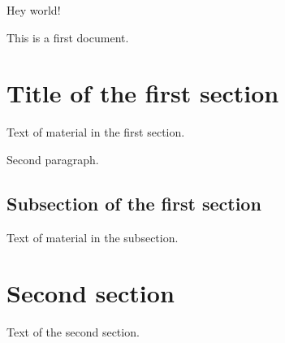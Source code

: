 \documentclass{article}
\begin{document}
	Hey world!
	
	This is a first document.
	
	\section{Title of the first section}
	
	Text of material in the first section.
	
	Second paragraph.
	
	\subsection{Subsection of the first section}
	
	Text of material in the subsection.
	
	\section{Second section}
	
	Text of the second section.
\end{document}
